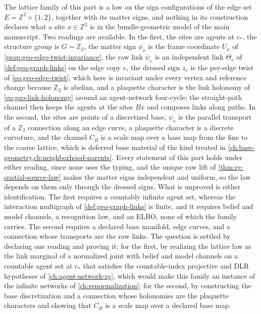 The lattice family of this part is a law on the sign configurations of the
edge set \(E=\mathbb Z^2\times\{1,2\}\), together with its matter signs, and
nothing in its construction declares what a site \(x\in\mathbb Z^2\) is in
the bundle-geometric model of the main manuscript. Two readings are
available. In the first, the sites are agents at \(c_*\), the structure
group is \(G=\mathbb Z_2\), the matter sign \(\phi_x\) is the frame
coordinate \(U_x\) of \cref{prop:geo-edge-twist-invariance}, the raw link
\(\psi_e\) is an independent link \(\Theta_e\) of
\cref{def:geo-graph-links} on the edge copy \(e\), the dressed sign \(z_e\)
is the per-edge twist of \cref{eq:geo-edge-twist}, which here is invariant
under every vertex and reference change because \(\mathbb Z_2\) is
abelian, and a plaquette character is
the link holonomy of \cref{eq:geo-link-holonomy} around an agent-network
four-cycle; the
straight-path channel then keeps the agents at the sites \(Bx\) and composes
links along paths. In the second, the sites are points of a discretized
base, \(\psi_e\) is the parallel transport of a \(\mathbb Z_2\) connection
along an edge curve, a plaquette character is a discrete curvature, and the
channel \(C_B\) is a scale map over a base map from the fine to the coarse
lattice, which is deferred base material of the kind treated in
\cref{ch:base-geometry,ch:neighborhood-parents}. Every
statement of this part holds under either reading, since none uses the
typing, and the unique raw lift of \cref{thm:rg-spatial-source-law} makes
the matter signs independent and uniform, so the law depends on them only
through the dressed signs. What is unproved is either identification. The
first requires a countably infinite agent set, whereas the interaction
multigraph of \cref{def:geo-graph-links} is finite, and it requires belief
and model channels, a recognition law, and an ELBO, none of which the
family carries. The second requires a declared base manifold, edge curves,
and a connection whose transports are the raw links. The question is
settled by declaring one reading and proving it: for the first, by
realizing the lattice law as the link marginal of a normalized joint with
belief and model channels on a countable agent set at \(c_*\) that satisfies
the countable-index projective and DLR hypotheses of
\cref{ch:agent-network-rg}, which would make this family an instance of the
infinite networks of \cref{ch:renormalization}; for the second, by
constructing the base discretization and a connection whose holonomies are
the plaquette characters and showing that \(C_B\) is a scale map over a
declared base map.

